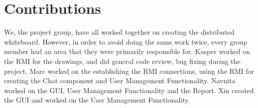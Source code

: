 \chapter{Contributions}
We, the project group, have all worked together on creating the distributed whiteboard. However, in order to avoid doing the same work twice, every group member had an area that they were primarily responsible for. Kasper worked on the RMI for the drawings, and did general code review, bug fixing during the project. Marc worked on the establishing the RMI connections, using the RMI for creating the Chat component and User Management Functionality. Navnita worked on the GUI, User Management Functionality and the Report. Xin created the GUI and worked on the User Management Functionality.